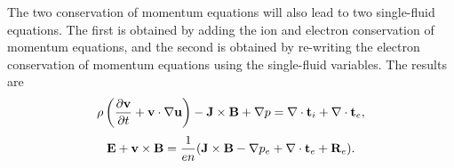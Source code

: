 \documentclass[oneside,a4paper,11pt]{report}
\begin{document}
The two conservation of momentum equations will also lead to two single-fluid equations. The first is obtained by adding the ion and electron conservation of momentum equations, and the second is obtained by re-writing the electron conservation of momentum equations using the single-fluid variables. The results are
\begin{equation}
\label{eq:generalized_MHD_vel}
    \rho \left (\frac{\partial \mathbf{v}}{\partial t} + \mathbf{v} \cdot \nabla \mathbf{u} \right) - \mathbf{J} \times \mathbf{B} + \nabla p = \nabla \cdot \mathbf{t}_i + \nabla \cdot \mathbf{t}_e,
\end{equation}
\begin{equation}
\label{eq:generalized_MHD_ohms}
    \mathbf{E} + \mathbf{v} \times \mathbf{B} = \frac{1}{en} ( \mathbf{J} \times \mathbf{B} - \nabla p_e + \nabla \cdot \mathbf{t}_e + \mathbf{R}_e).
\end{equation}
\end{document}

